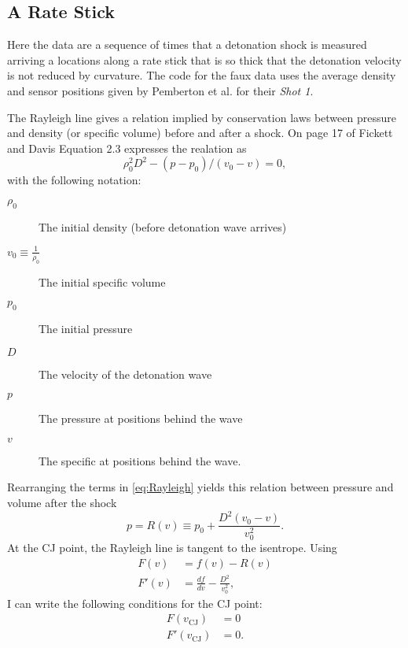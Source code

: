 \documentclass[11pt]{article}
\newcommand{\eos}{f}
\begin{document}
\subsection{A Rate Stick}
\label{sec:rate-stick}

Here the data are a sequence of times that a detonation shock is
measured arriving a locations along a rate stick that is so thick that
the detonation velocity is not reduced by curvature.  The code for the
faux data uses the average density and sensor positions given by
Pemberton et al.\cite{Pemberton9501} for their \emph{Shot 1}.

The Rayleigh line gives a relation implied by conservation laws
between pressure and density (or specific volume) before and after a
shock.  On page 17 of Fickett and Davis\cite{FickettDavis} Equation
2.3 expresses the realation as
\begin{equation}
  \label{eq:Rayleigh}
  \rho_0^2 D^2 - (p-p_0)/(v_0-v) = 0,
\end{equation}
with the following notation:
\begin{description}
\item[$\rho_0$] The initial density (before detonation wave arrives)
\item[$v_0\equiv\frac{1}{\rho_0}$] The initial specific volume
\item[$p_0$] The initial pressure
\item[$D$] The velocity of the detonation wave
\item[$p$] The pressure at positions behind the wave
\item[$v$] The specific at positions behind the wave.
\end{description}
Rearranging the terms in \eqref{eq:Rayleigh} yields this relation
between pressure and volume after the shock
\begin{equation*}
  p = R(v) \equiv p_0 + \frac{D^2(v_0-v)}{v_0^2}.
\end{equation*}
At the CJ point, the Rayleigh line is tangent to the isentrope.
Using
\begin{align*}
  F(v) &= \eos(v) - R(v) \\
  F'(v) &= \frac{d \eos}{d v} - \frac{D^2}{v_0^2},
\end{align*}
I can write the following conditions for the CJ point:
\begin{align*}
  F(v_{\text{CJ}}) &= 0 \\
  F'(v_{\text{CJ}}) &= 0.
\end{align*}
\end{document}
